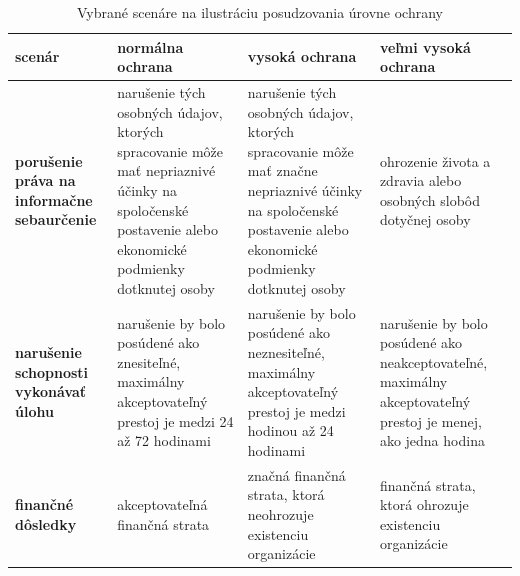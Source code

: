 \begin{table}[h!]
    \caption{Vybrané scenáre na ilustráciu posudzovania úrovne ochrany}
    \label{tab:protectionscenario}
    \begin{center}
            \begin{tabularx}{\textwidth}{|>{\raggedright\arraybackslash}p{2.8cm}
                                  |>{\raggedright\arraybackslash}X
                                  |>{\raggedright\arraybackslash}X
                                  |>{\raggedright\arraybackslash}X|}
            \hline
            \textbf{scenár} & \textbf{normálna ochrana} & \textbf{vysoká ochrana} & \textbf{veľmi vysoká ochrana}
            \\
            \hline
            \hline
            \textbf{porušenie práva na informačne sebaurčenie}
             &
            narušenie tých osobných údajov, ktorých spracovanie môže mať nepriaznivé účinky na spoločenské postavenie alebo ekonomické podmienky dotknutej osoby
             &
            narušenie tých osobných údajov, ktorých spracovanie môže mať značne nepriaznivé účinky na spoločenské postavenie alebo ekonomické podmienky dotknutej osoby
             &
            ohrozenie života a zdravia alebo osobných slobôd dotyčnej osoby
            \\
            \hline
            \textbf{narušenie schopnosti vykonávať úlohu}
             &
            narušenie by bolo posúdené ako znesiteľné, maximálny akceptovateľný prestoj je medzi 24 až 72 hodinami
             &
            narušenie by bolo posúdené ako neznesiteľné, maximálny akceptovateľný prestoj je medzi hodinou až 24 hodinami
             &
            narušenie by bolo posúdené ako neakceptovateľné, maximálny akceptovateľný prestoj je menej, ako jedna hodina
            \\
            \hline
            \textbf{finančné dôsledky}
             &
            akceptovateľná finančná strata
             &
            značná finančná strata, ktorá neohrozuje existenciu organizácie
             &
            finančná strata, ktorá ohrozuje existenciu organizácie
            \\
            \hline
        \end{tabularx}
    \end{center}
\end{table}

